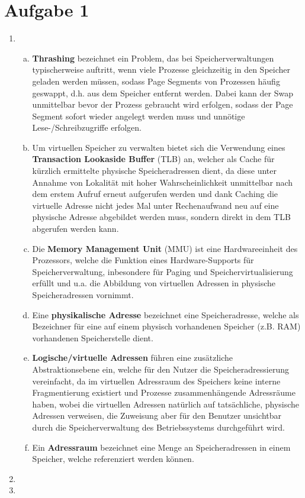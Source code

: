 \documentclass[numbers=noendperiod]{scrartcl}
\begin{document}
\section{Aufgabe 1}
\begin{enumerate}[1.]
	\item \begin{enumerate}[a)]
		\item \textbf{Thrashing} bezeichnet ein Problem, das bei Speicherverwaltungen typischerweise auftritt, wenn viele Prozesse gleichzeitig in den Speicher geladen werden müssen, sodass Page Segments von Prozessen häufig geswappt, d.h. aus dem Speicher entfernt werden. Dabei kann der Swap unmittelbar bevor der Prozess gebraucht wird erfolgen, sodass der Page Segment sofort wieder angelegt werden muss und unnötige Lese-/Schreibzugriffe erfolgen.
		
		\item Um virtuellen Speicher zu verwalten bietet sich die Verwendung eines \textbf{Transaction Lookaside Buffer} (TLB) an, welcher als Cache für kürzlich ermittelte physische Speicheradressen dient, da diese unter Annahme von Lokalität mit hoher Wahrscheinlichkeit unmittelbar nach dem erstem Aufruf erneut aufgerufen werden und dank Caching die virtuelle Adresse nicht jedes Mal unter Rechenaufwand neu auf eine physische Adresse abgebildet werden muss, sondern direkt in dem TLB abgerufen werden kann.
		
		\item Die \textbf{Memory Management Unit} (MMU) ist eine Hardwareeinheit des Prozessors, welche die Funktion eines Hardware-Supports für Speicherverwaltung, inbesondere für Paging und Speichervirtualisierung erfüllt und u.a. die Abbildung von virtuellen Adressen in physische Speicheradressen vornimmt.
		
		\item Eine \textbf{physikalische Adresse} bezeichnet eine Speicheradresse, welche als Bezeichner für eine auf einem physisch vorhandenen Speicher (z.B. RAM) vorhandenen Speicherstelle dient.
		
		\item \textbf{Logische/virtuelle Adressen} führen eine zusätzliche Abstraktionsebene ein, welche für den Nutzer die Speicheradressierung vereinfacht, da im virtuellen Adressraum des Speichers keine interne Fragmentierung existiert und Prozesse zusammenhängende Adressräume haben, wobei die virtuellen Adressen natürlich auf tatsächliche, physische Adressen verweisen, die Zuweisung aber für den Benutzer unsichtbar durch die Speicherverwaltung des Betriebssystems durchgeführt wird.
		
		\item Ein \textbf{Adressraum} bezeichnet eine Menge an Speicheradressen in einem Speicher, welche referenziert werden können.
	\end{enumerate}
	
	\item 
	
	\item
	
\end{enumerate}
	
\end{document}
